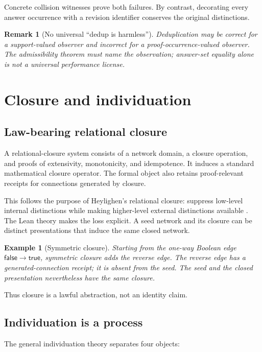 \documentclass[11pt]{article}
\newtheorem{example}[theorem]{Example}
\newtheorem{remark}[theorem]{Remark}
\begin{document}
Concrete collision witnesses prove both failures.  By contrast, decorating every
answer occurrence with a revision identifier conserves the original distinctions.

\begin{remark}[No universal ``dedup is harmless'']
Deduplication may be correct for a support-valued observer and incorrect for a
proof-occurrence-valued observer.  The admissibility theorem must name the observation;
answer-set equality alone is not a universal performance license.
\end{remark}

\section{Closure and individuation}

\subsection{Law-bearing relational closure}

A relational-closure system consists of a network domain, a closure operation, and
proofs of extensivity, monotonicity, and idempotence.  It induces a standard
mathematical closure operator.  The formal object also retains proof-relevant receipts
for connections generated by closure.

This follows the purpose of Heylighen's relational closure: suppress low-level
internal distinctions while making higher-level external distinctions available
\cite{heylighen1990}.  The Lean theory makes the loss explicit.  A seed network and
its closure can be distinct presentations that induce the same closed network.

\begin{example}[Symmetric closure]
Starting from the one-way Boolean edge $\mathsf{false}\to\mathsf{true}$, symmetric
closure adds the reverse edge.  The reverse edge has a generated-connection receipt;
it is absent from the seed.  The seed and the closed presentation nevertheless have
the same closure.
\end{example}

Thus closure is a lawful abstraction, not an identity claim.

\subsection{Individuation is a process}

The general individuation theory separates four objects:
\end{document}
